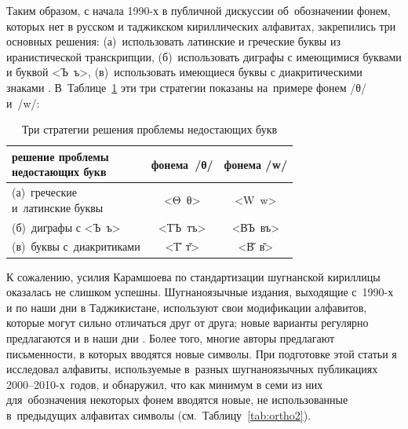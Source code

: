 Таким образом, с начала 1990-х в публичной дискуссии об~обозначении фонем, которых нет в русском и таджикском кириллических алфавитах, закрепились три основных решения: (а)~использовать латинские и греческие буквы из иранистической транскрипции, (б)~использовать диграфы с имеющимися буквами и буквой <Ъ~ъ>, (в)~использовать имеющиеся буквы с диакритическими знаками \parencite[35]{dodikhudoeva2005}. В~Таблице~\ref{tab:ortho1} эти три стратегии показаны на~примере фонем /θ/ и~/w/:

\begin{table}[h]
 \centering
 \caption{Три стратегии решения проблемы недостающих букв}
 \smallskip
 \label{tab:ortho1}
 \begin{tabular}{l|cc} \toprule
 \makecell[l]{решение проблемы\\недостающих букв} & фонема~/θ/ & фонема /w/ \\ \midrule
 \makecell[l]{(а)~греческие\\и~латинские буквы} & <Θ~θ> & <W~w> \\
 (б)~диграфы с <Ъ~ъ> & <ТЪ~тъ> & <ВЪ~въ> \\
 (в)~буквы с~диакритиками & <Т̌~т̌> & <В̌~в̌> \\ \bottomrule
 \end{tabular}
\end{table}

К сожалению, усилия Карамшоева по стандартизации шугнанской кириллицы оказалась не слишком успешны. Шугнаноязычные издания, выходящие с~1990-х и по наши дни в Таджикистане, используют свои модификации алфавитов, которые могут сильно отличаться друг от друга; новые варианты регулярно предлагаются и в наши дни \parencite[21]{edelman2020_steps}. Более того, многие авторы предлагают письменности, в которых вводятся новые символы. При подготовке этой статьи я исследовал алфавиты, используемые в~разных шугнаноязычных публикациях 2000–2010-х~годов, и обнаружил, что как минимум в семи из них для~обозначения некоторых фонем вводятся новые, не использованные в~предыдущих алфавитах символы (см.~Таблицу~\ref{tab:ortho2}).

